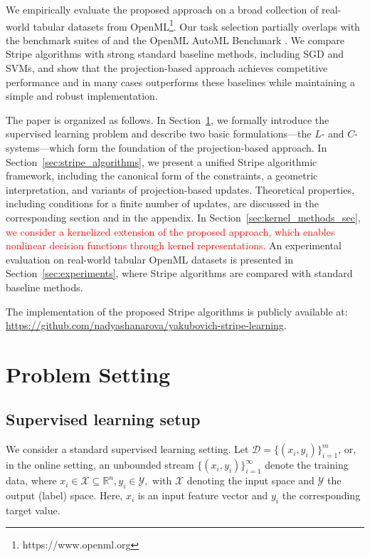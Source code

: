 \documentclass[a4paper,fleqn]{cas-sc}
\begin{document}
We empirically evaluate the proposed approach on a broad collection of real-world tabular datasets from OpenML{\footnote{https://www.openml.org}}. Our task selection partially overlaps with the benchmark suites of \cite{bischl2021openmlbenchmarkingsuites} and the OpenML AutoML Benchmark \cite{gijsbers2019opensourceautomlbenchmark}. We compare Stripe algorithms with strong standard baseline methods, including SGD and SVMs, and show that the projection-based approach achieves competitive performance and in many cases outperforms these baselines while maintaining a simple and robust implementation.

The paper is organized as follows. In Section~\ref{sec:problem}, we formally introduce the supervised learning problem
and describe two basic formulations—the $L$- and $C$-systems—which form the foundation
of the projection-based approach.
In Section~\ref{sec:stripe_algorithms}, we present a unified Stripe algorithmic framework,
including the canonical form of the constraints, a geometric interpretation,
and variants of projection-based updates.
Theoretical properties, including conditions for a finite number of updates,
are discussed in the corresponding section and in the appendix.
In Section~\ref{sec:kernel_methods_sec}, \textcolor{red}{we consider a kernelized extension of the proposed approach, which enables nonlinear decision functions through kernel representations.}
An experimental evaluation on real-world tabular OpenML datasets is presented in
Section~\ref{sec:experiments}, where Stripe algorithms are compared with standard baseline methods.


The implementation of the proposed Stripe algorithms is publicly available at: \url{https://github.com/nadyashanarova/yakubovich-stripe-learning}.

\section{Problem Setting}
\label{sec:problem}
\subsection{Supervised learning setup}

We consider a standard supervised learning setting.
Let
$
\mathcal{D} = \{(x_i, y_i)\}_{i=1}^{m}
$, or, in the online setting, an unbounded stream $\{(x_i, y_i)\}_{i=1}^{\infty}$
denote the training data, where
$
x_i \in \mathcal{X} \subseteq \mathbb{R}^n, y_i \in \mathcal{Y},
$
with $\mathcal{X}$ denoting the input space and $\mathcal{Y}$ the output (label) space. Here, $x_i$ is an input feature vector and $y_i$ the corresponding target value.
\end{document}
